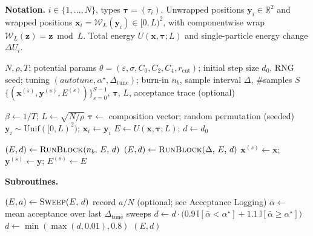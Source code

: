 \documentclass[11pt]{article}
\begin{document}
\begin{algorithm}[t]
\caption{KA2D Metropolis Monte Carlo (burn-in, interval sampling; unwrapped trajectory)}
\label{alg:ka2d-mc}
\textbf{Notation.}
$i\in\{1,\dots,N\}$, types $\boldsymbol{\tau}=(\tau_i)$.
Unwrapped positions $\mathbf{y}_i\in\mathbb{R}^2$ and wrapped positions
$\mathbf{x}_i=\mathcal{W}_L(\mathbf{y}_i)\in[0,L)^2$, with componentwise wrap
$\mathcal{W}_L(\mathbf{z})=\mathbf{z}\bmod L$.
Total energy $U(\mathbf{x},\boldsymbol{\tau};L)$ and single-particle energy change $\Delta U_i$.

\begin{algorithmic}[1]
\Require $N,\rho,T$; potential params $\theta=(\varepsilon,\sigma,C_0,C_2,C_4,r_\mathrm{cut})$;
        initial step size $d_0$, RNG seed;
        tuning $(autotune,\alpha^\star,\Delta_{\mathrm{tune}})$;
        burn-in $n_b$, sample interval $\Delta$, \#samples $S$
\Ensure $\{(\mathbf{x}^{(s)},\mathbf{y}^{(s)},E^{(s)})\}_{s=0}^{S-1}$, $\boldsymbol{\tau}$, $L$, acceptance trace (optional)

\State $\beta \gets 1/T$; $L \gets \sqrt{N/\rho}$
\State $\boldsymbol{\tau}\gets$ composition vector; random permutation (seeded)
\State $\mathbf{y}_i \sim \mathrm{Unif}([0,L)^2)$; $\mathbf{x}_i \gets \mathbf{y}_i$ 
\State $E \gets U(\mathbf{x},\boldsymbol{\tau};L)$; $d\gets d_0$

\State $(E,d)\gets \Call{RunBlock}{n_b,\,E,\,d}$ 
  \State $(E,d)\gets \Call{RunBlock}{\Delta,\,E,\,d}$
  \State $\mathbf{x}^{(s)}\gets \mathbf{x}$; $\mathbf{y}^{(s)}\gets \mathbf{y}$; $E^{(s)}\gets E$
\EndFor
\end{algorithmic}

\vspace{0.5em}
\textbf{Subroutines.}
\begin{algorithmic}[1]
    \State $(E,a)\gets \Call{Sweep}{E,\,d}$
    \State record $a/N$ (optional; see Acceptance Logging)
      \State $\bar{\alpha}\gets$ mean acceptance over last $\Delta_{\mathrm{tune}}$ sweeps
      \State $d\gets d\cdot\bigl(0.9\,\mathbb{I}[\bar{\alpha}<\alpha^\star]+1.1\,\mathbb{I}[\bar{\alpha}\ge\alpha^\star]\bigr)$
      \State $d\gets \min(\max(d,0.01),0.8)$
    \EndIf
  \EndFor
  \State \Return $(E,d)$
\EndFunction


\end{algorithmic}
\end{algorithm}
\end{document}
